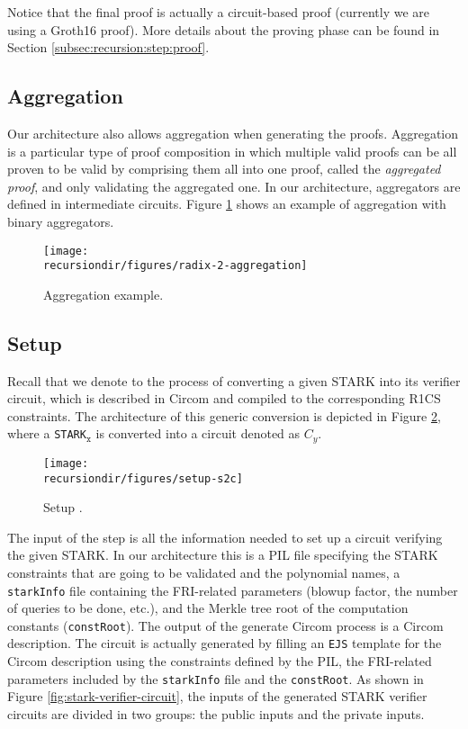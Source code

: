 Notice that the final proof is actually a circuit-based proof (currently we are using a Groth16 proof). More details about the proving phase can be found in Section \ref{subsec:recursion:step:proof}.


\subsection{Aggregation} 

Our architecture also allows aggregation when generating the proofs. Aggregation is a particular type of proof composition in which multiple valid proofs can be all proven to be valid by comprising them all into one proof, called the \textit{aggregated proof}, and only validating the aggregated one.
In our architecture, aggregators are defined in intermediate circuits.
Figure \ref{fig:aggregation_example} shows an example of aggregation with binary aggregators.
\begin{figure}[H]
\centering
\texttt{[image: \\recursiondir/figures/radix-2-aggregation]}
\caption{Aggregation example.}
\label{fig:aggregation_example}
\end{figure}


\subsection{Setup \stoc \label{subsec:stoc}}

Recall that we denote \stoc to the process of converting a given STARK into its verifier circuit, which is described in Circom and compiled to the corresponding R1CS constraints. The architecture of this generic conversion is depicted in Figure \ref{fig:setup-p2c}, where a \texttt{STARK}$_\texttt{x}$ is converted into a circuit denoted as $C_y$.


\begin{figure}[H]
\centering
\texttt{[image: \\recursiondir/figures/setup-s2c]}
\caption{Setup \stoc.}
\label{fig:setup-p2c}
\end{figure}

The input of the \stoc step is all the information needed to set up a circuit verifying the given STARK. 
In our architecture this is a PIL file specifying the STARK constraints that are going to be validated and the polynomial names, a \texttt{starkInfo} file containing the FRI-related parameters (blowup factor, the number of queries to be done, etc.), 
and the Merkle tree root of the computation constants (\texttt{constRoot}).
The output of the generate Circom process is a Circom description. 
The circuit is actually generated by filling an  \texttt{EJS} template
for the Circom description using the constraints defined by the PIL, the FRI-related parameters included by the \texttt{starkInfo} file and the \texttt{constRoot}. 
As shown in Figure \ref{fig:stark-verifier-circuit}, the inputs of the generated STARK verifier circuits are divided in two groups: the public inputs and the private inputs.

